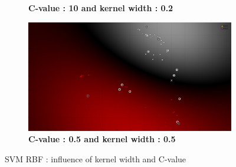 \begin{figure}[!ht]
\begin{subfigure}[t]{0.2\textwidth}
\caption{\bf C-value : 10 and kernel width : 0.2}
\label{fig:SVM_rbf_w_0_2_c_10_TR_25_}
\end{subfigure}
\hfill
\begin{subfigure}[t]{0.2\textwidth}
\includegraphics[height=0.08\textheight]{./classification/SVM_rbf_w_0_5_c_0_5_TR_25_.png}
\caption{\bf C-value : 0.5 and kernel width : 0.5}
\label{fig:SVM_rbf_w_0_5_c_0_5_TR_25_}
\end{subfigure}

\caption{SVM RBF : influence of kernel width and C-value}
\label{fig:SVM_RBF}
\end{figure}




